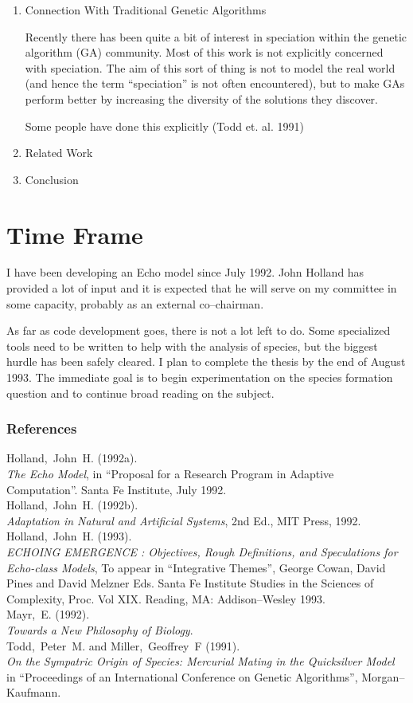 \begin{enumerate}
\item Connection With Traditional Genetic Algorithms

Recently there has been quite a bit of interest in speciation within the
genetic algorithm (GA) community. Most of this work is not explicitly
concerned with speciation. The aim of this sort of thing is not to
model the real world (and hence the term ``speciation'' is not often
encountered), but to make GAs perform better by increasing the
diversity of the solutions they discover.

Some people have done this explicitly (Todd et. al. 1991)

\item Related Work

\item Conclusion

\end{enumerate}

\section{Time Frame}

I have been developing an Echo model since July 1992. John Holland has
provided a lot of input and it is expected that he will serve on my
committee in some capacity, probably as an external co--chairman.

As far as code development goes, there is not a lot left to do. Some
specialized tools need to be written to help with the analysis of
species, but the biggest hurdle has been safely cleared. I plan to
complete the thesis by the end of August 1993. The immediate goal is
to begin experimentation on the species formation question and to
continue broad reading on the subject.

\subsubsection*{References}

Holland,~John~H. (1992a). \\
{\em The Echo Model},
in ``Proposal for a Research Program in Adaptive Computation''.
Santa Fe Institute, July 1992. \\

Holland,~John~H. (1992b). \\
{\em Adaptation in Natural and Artificial Systems}, 2nd Ed.,
MIT Press, 1992. \\

Holland,~John~H. (1993). \\
{\em ECHOING EMERGENCE : Objectives, Rough Definitions, and
Speculations for Echo-class Models},
To appear in ``Integrative Themes'', George Cowan, David Pines and
David Melzner Eds. Santa Fe Institute Studies in the Sciences of
Complexity, Proc. Vol XIX. Reading, MA: Addison--Wesley 1993. \\

Mayr,~E. (1992). \\
{\em Towards a New Philosophy of Biology}. \\

Todd,~Peter~M. and Miller,~Geoffrey~F (1991). \\
{\em On the Sympatric Origin of Species: Mercurial Mating in the
Quicksilver Model} in ``Proceedings of an International Conference on
Genetic Algorithms'', Morgan--Kaufmann.


